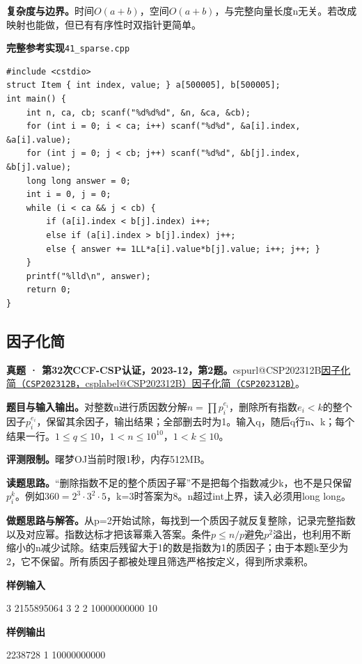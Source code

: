 \documentclass[UTF8,11pt,a4paper,fontset=none]{ctexart}
\makeatletter
\newcommand{\csp}[2]{\ifcsname cspurl@#1\endcsname\href{\csname cspurl@#1\endcsname}{#2（\texttt{#1}，\csname csplabel@#1\endcsname）}\else\href{https://oj.shumeng.tech/p/#1}{#2（\texttt{#1}）}\fi}
\makeatother
\begin{document}
\noindent\textbf{复杂度与边界。}时间$O(a+b)$，空间$O(a+b)$，与完整向量长度n无关。若改成映射也能做，但已有有序性时双指针更简单。
\par\noindent\begin{minipage}{\linewidth}
\textbf{完整参考实现}\quad\texttt{41\_sparse.cpp}
\begin{lstlisting}
#include <cstdio>
struct Item { int index, value; } a[500005], b[500005];
int main() {
    int n, ca, cb; scanf("%d%d%d", &n, &ca, &cb);
    for (int i = 0; i < ca; i++) scanf("%d%d", &a[i].index, &a[i].value);
    for (int j = 0; j < cb; j++) scanf("%d%d", &b[j].index, &b[j].value);
    long long answer = 0;
    int i = 0, j = 0;
    while (i < ca && j < cb) {
        if (a[i].index < b[j].index) i++;
        else if (a[i].index > b[j].index) j++;
        else { answer += 1LL*a[i].value*b[j].value; i++; j++; }
    }
    printf("%lld\n", answer);
    return 0;
}
\end{lstlisting}
\end{minipage}\par

\subsection{因子化简}
\textbf{真题 · 第32次CCF-CSP认证，2023-12，第2题。}\csp{CSP202312B}{因子化简}。

\noindent\textbf{题目与输入输出。}对整数n进行质因数分解$n=\prod p_i^{e_i}$，删除所有指数$e_i<k$的整个因子$p_i^{e_i}$，保留其余因子，输出结果；全部删去时为1。输入q，随后q行n、k；每个结果一行。$1\le q\le10$，$1<n\le10^{10}$，$1<k\le10$。

\noindent\textbf{评测限制。}曙梦OJ当前时限1秒，内存512MB。

\noindent\textbf{读题思路。}“删除指数不足的整个质因子幂”不是把每个指数减少k，也不是只保留$p_i^k$。例如$360=2^3\cdot3^2\cdot5$，k=3时答案为8。n超过int上界，读入必须用long long。

\noindent\textbf{做题思路与解答。}从p=2开始试除，每找到一个质因子就反复整除，记录完整指数以及对应幂。指数达标才把该幂乘入答案。条件$p\le n/p$避免$p^2$溢出，也利用不断缩小的n减少试除。结束后残留大于1的数是指数为1的质因子；由于本题k至少为2，它不保留。所有质因子都被处理且筛选严格按定义，得到所求乘积。
\begin{tcolorbox}[samplebox,title={输入输出样例}]
\textbf{样例输入}
\begin{Sample}
3
2155895064 3
2 2
10000000000 10
\end{Sample}
\tcblower
\textbf{样例输出}
\begin{Sample}
2238728
1
10000000000
\end{Sample}
\end{tcolorbox}
\end{document}
